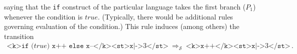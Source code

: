 saying that the \texttt{if} construct of the particular language takes the first branch ($P_1$)
whenever the condition is $\mathit{true}$. (Typically, there would be additional rules governing evaluation of the condition.)
%
This rule induces (among others) the transition
\begin{equation}\label{eqn:ruleIfTrue}
    \begin{aligned}
    \texttt{<k>if (} \mathit{true} \texttt{) x++ else x--</k><st>x} \texttt{|->} 3\texttt{</st>}
    \ \Rightarrow_{\mathcal{S}}\  \texttt{<k>x++</k><st>x} \texttt{|->} 3\texttt{</st>} \, .
    \end{aligned}
\end{equation}






